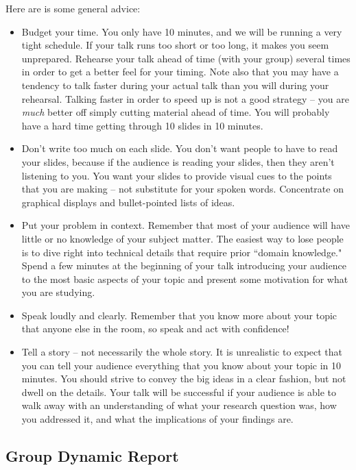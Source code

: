 \documentclass[10pt]{article}
\begin{document}
Here are is some general advice:
	\begin{itemize}
		\item Budget your time. You only have 10 minutes, and we will be running a very tight schedule. If your talk runs too short or too long, it makes you seem unprepared. Rehearse your talk ahead of time (with your group) several times in order to get a better feel for your timing. Note also that you may have a tendency to talk faster during your actual talk than you will during your rehearsal. Talking faster in order to speed up is not a good strategy -- you are \emph{much} better off simply cutting material ahead of time. You will probably have a hard time getting through 10 slides in 10 minutes. 
		\item Don't write too much on each slide. You don't want people to have to read your slides, because if the audience is reading your slides, then they aren't listening to you. You want your slides to provide visual cues to the points that you are making -- not substitute for your spoken words. Concentrate on graphical displays and bullet-pointed lists of ideas. 
		\item Put your problem in context. Remember that most of your audience will have little or no knowledge of your subject matter. The easiest way to lose people is to dive right into technical details that require prior ``domain knowledge." Spend a few minutes at the beginning of your talk introducing your audience to the most basic aspects of your topic and present some motivation for what you are studying. 
		\item Speak loudly and clearly. Remember that you know more about your topic that anyone else in the room, so speak and act with confidence!
		\item Tell a story -- not necessarily the whole story. It is unrealistic to expect that you can tell your audience everything that you know about your topic in 10 minutes. You should strive to convey the big ideas in a clear fashion, but not dwell on the details. Your talk will be successful if your audience is able to walk away with an understanding of what your research question was, how you addressed it, and what the implications of your findings are. 
	\end{itemize}

\subsection{Group Dynamic Report}
\end{document}
